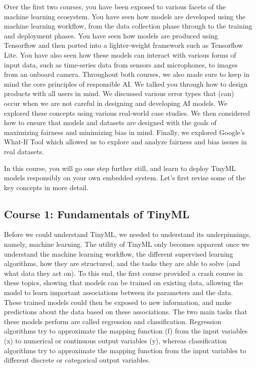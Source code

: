 Over the first two courses, you have been exposed to various facets of the machine learning ecosystem. You have seen how models are developed using the machine learning workflow, from the data collection phase through to the training and deployment phases. You have seen how models are produced using Tensorflow and then ported into a lighter-weight framework such as Tensorflow Lite. You have also seen how these models can interact with various forms of input data, such as time-series data from sensors and microphones, to images from an onboard camera. Throughout both courses, we also made sure to keep in mind the core principles of responsible AI. We talked you through how to design products with all users in mind. We discussed various error types that (can) occur when we are not careful in designing and developing AI models. We explored these concepts using various real-world case studies. We then considered how to ensure that models and datasets are designed with the goals of maximizing fairness and minimizing bias in mind. Finally, we explored Google’s What-If Tool which allowed us to explore and analyze fairness and bias issues in real datasets.

In this course, you will go one step further still, and learn to deploy TinyML models responsibly on your own embedded system. Let’s first revise some of the key concepts in more detail.

\subsection{Course 1: Fundamentals of TinyML}

Before we could understand TinyML, we needed to understand its underpinnings, namely, machine learning. The utility of TinyML only becomes apparent once we understand the machine learning workflow, the different supervised learning algorithms, how they are structured, and the tasks they are able to solve (and what data they act on). To this end, the first course provided a crash course in these topics, showing that models can be trained on existing data, allowing the model to learn important associations between its parameters and the data. These trained models could then be exposed to new information, and make predictions about the data based on these associations. The two main tasks that these models perform are called regression and classification. Regression algorithms try to approximate the mapping function (f) from the input variables (x) to numerical or continuous output variables (y), whereas classification algorithms try to approximate the mapping function from the input variables to different discrete or categorical output variables.

